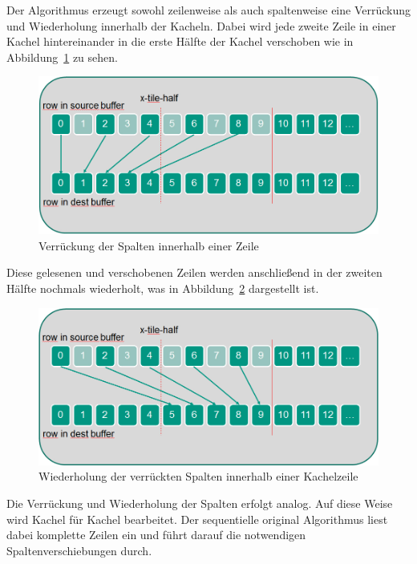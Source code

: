 \documentclass[10pt,a4paper]{article}
\begin{document}
Der Algorithmus erzeugt sowohl zeilenweise als auch spaltenweise eine Verrückung und Wiederholung innerhalb der Kacheln. Dabei wird jede zweite Zeile in einer Kachel hintereinander in die erste Hälfte der Kachel verschoben wie in Abbildung~\ref{fig:gtile1} zu sehen.
\begin{figure}[h]
\begin{center}
\includegraphics[scale=.4]{gtile1.png}
\end{center}
\caption{Verrückung der Spalten innerhalb einer Zeile}\label{fig:gtile1}
\end{figure}
Diese gelesenen und verschobenen Zeilen werden anschließend in der zweiten Hälfte nochmals wiederholt, was in Abbildung~\ref{fig:gtile2} dargestellt ist.
\begin{figure}
\begin{center}
\includegraphics[scale=.4]{gtile2.png}
\end{center}
\caption{Wiederholung der verrückten Spalten innerhalb einer Kachelzeile}\label{fig:gtile2}
\end{figure}
Die Verrückung und Wiederholung der Spalten erfolgt analog. Auf diese Weise wird Kachel für Kachel bearbeitet. Der sequentielle original Algorithmus liest dabei komplette Zeilen ein und führt darauf die notwendigen Spaltenverschiebungen durch.
\end{document}
